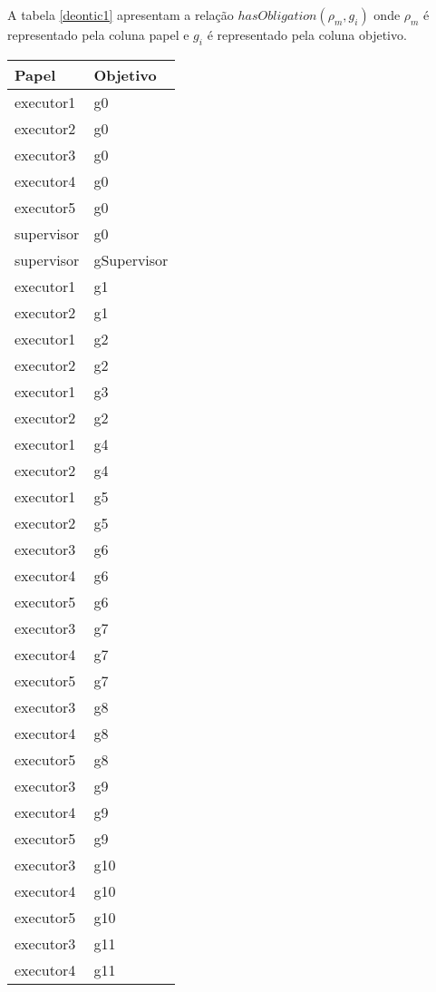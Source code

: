 A tabela \ref{deontic1}  apresentam a relação $hasObligation(\rho_m,g_i)$ onde $\rho_m$ é representado pela coluna papel e $g_i$ é representado pela coluna objetivo. 


\begin{center}
\begin{longtable}[H]{|l|l|}
\hline
\textbf{Papel} & \textbf{Objetivo} \\ \hline
executor1 & g0 \\ \hline
executor2 & g0 \\ \hline
executor3 & g0 \\ \hline
executor4 & g0 \\ \hline
executor5 & g0 \\ \hline
supervisor & g0 \\ \hline
supervisor & gSupervisor \\ \hline
executor1 & g1 \\ \hline
executor2 & g1 \\ \hline
executor1 & g2 \\ \hline
executor2 & g2 \\ \hline
executor1 & g3 \\ \hline
executor2 & g2 \\ \hline
executor1 & g4 \\ \hline
executor2 & g4 \\ \hline
executor1 & g5 \\ \hline
executor2 & g5 \\ \hline
executor3 & g6 \\ \hline
executor4 & g6 \\ \hline
executor5 & g6 \\ \hline
executor3 & g7 \\ \hline
executor4 & g7 \\ \hline
executor5 & g7 \\ \hline
executor3 & g8 \\ \hline
executor4 & g8 \\ \hline
executor5 & g8 \\ \hline
executor3 & g9 \\ \hline
executor4 & g9 \\ \hline
executor5 & g9 \\ \hline
executor3 & g10 \\ \hline
executor4 & g10 \\ \hline
executor5 & g10 \\ \hline
executor3 & g11 \\ \hline
executor4 & g11 \\ \hline

\end{longtable}
\end{center}
